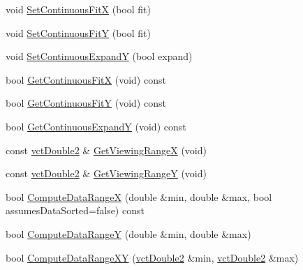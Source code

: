 {\bf }\par
\begin{DoxyCompactItemize}
\item 
void \hyperlink{classvct_plot2_d_base_1_1_scale_aea5c908466465711922ceaa8245bb96f}{Set\+Continuous\+Fit\+X} (bool fit)
\item 
void \hyperlink{classvct_plot2_d_base_1_1_scale_a860a6e558da6149c743e6fc60f90f744}{Set\+Continuous\+Fit\+Y} (bool fit)
\item 
void \hyperlink{classvct_plot2_d_base_1_1_scale_a0a1358c1d3f86a3e07edc4f2ee5264bf}{Set\+Continuous\+Expand\+Y} (bool expand)
\end{DoxyCompactItemize}

{\bf }\par
\begin{DoxyCompactItemize}
\item 
bool \hyperlink{classvct_plot2_d_base_1_1_scale_adcc4dbccfa311a0c353dfdab8be300a9}{Get\+Continuous\+Fit\+X} (void) const 
\item 
bool \hyperlink{classvct_plot2_d_base_1_1_scale_a1834c8b58a055af01b0dc3cf416f0e3a}{Get\+Continuous\+Fit\+Y} (void) const 
\item 
bool \hyperlink{classvct_plot2_d_base_1_1_scale_aa776dec8e6ab48ea4e750d5087b51e2f}{Get\+Continuous\+Expand\+Y} (void) const 
\item 
const \hyperlink{vct_fixed_size_vector_types_8h_afc0fdcc41cbe8b043747612501610812}{vct\+Double2} \& \hyperlink{classvct_plot2_d_base_1_1_scale_ae94065727370a80270300269cf80f79f}{Get\+Viewing\+Range\+X} (void)
\item 
const \hyperlink{vct_fixed_size_vector_types_8h_afc0fdcc41cbe8b043747612501610812}{vct\+Double2} \& \hyperlink{classvct_plot2_d_base_1_1_scale_a3b2b5ab13e443cc3020e251a8a039214}{Get\+Viewing\+Range\+Y} (void)
\end{DoxyCompactItemize}

{\bf }\par
\begin{DoxyCompactItemize}
\item 
bool \hyperlink{classvct_plot2_d_base_1_1_scale_a084a67fb1d9f2e88b5f112420ac67ff1}{Compute\+Data\+Range\+X} (double \&min, double \&max, bool assumes\+Data\+Sorted=false) const 
\item 
bool \hyperlink{classvct_plot2_d_base_1_1_scale_a9f3e0aac2072a067b34af58353f9c58f}{Compute\+Data\+Range\+Y} (double \&min, double \&max)
\item 
bool \hyperlink{classvct_plot2_d_base_1_1_scale_a6112d224229d6dadf22f4185cc6b3f0d}{Compute\+Data\+Range\+X\+Y} (\hyperlink{vct_fixed_size_vector_types_8h_afc0fdcc41cbe8b043747612501610812}{vct\+Double2} \&min, \hyperlink{vct_fixed_size_vector_types_8h_afc0fdcc41cbe8b043747612501610812}{vct\+Double2} \&max)
\end{DoxyCompactItemize}

